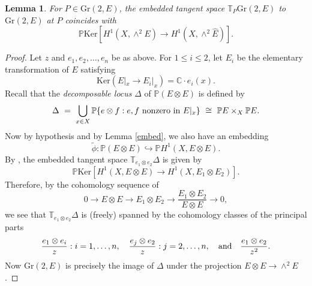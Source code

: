 \documentclass[10pt]{amsart}
\numberwithin{equation}{section}
\newcommand{\pp}{\mathbb P}
\newcommand{\cc}{\mathbb C}
\newcommand{\bt}{\mathbb T}
\newcommand{\Ker}{\mathrm{Ker}}
\newcommand{\Gr}{\mathrm{Gr}}
\newtheorem{lemma}[theorem]{{\textbf Lemma}}
\begin{document}
\begin{lemma} \label{tangent} For $P \in \Gr(2, E)$, the embedded tangent space $\bt_P \Gr(2, E)$ to $\Gr(2, E)$ at $P$ coincides with
\[ \pp \Ker \left[ H^1(X, \wedge^2 E) \longrightarrow H^1 \left( X, \wedge^2 \hat{E} \right) \right]. \]
\end{lemma}
\begin{proof}
Let $z$ and $e_1, e_2, \ldots , e_n$ be as above. For $1 \le i \le 2$, let $E_i$ be the elementary transformation of $E$ satisfying
\[ \Ker \left( E|_x \to E_i |_x \right) = \cc \cdot e_i (x). \]
Recall that the \textsl{decomposable locus} $\Delta$ of $\pp (E \otimes E)$ is defined by
\[ \Delta \ = \ \bigcup_{x \in X} \pp \{ e \otimes f : \hbox{$e, f$ nonzero in $E|_x$} \} \ \cong \ \pp E \times_X \pp E. \]
Now by hypothesis and by Lemma \ref{embed}, we also have an embedding
\[ \tilde{\phi} \colon \pp(E \otimes E) \hookrightarrow \pp H^1 (X, E \otimes E). \]
By \cite[Lemma 5.3]{CH1}, the embedded tangent space $\bt_{e_1 \otimes e_2} \Delta$ is given by
\[ \pp \Ker \left[ H^{1}(X, E \otimes E) \longrightarrow H^{1}(X, E_1 \otimes E_2) \right]. \]
Therefore, by the cohomology sequence of
\[ 0 \to E \otimes E \to E_1 \otimes E_2 \to \frac{E_1 \otimes E_2}{E \otimes E} \to 0, \]
we see that $\bt_{e_1 \otimes e_2} \Delta$ is (freely) spanned by the cohomology classes of the principal parts
\begin{equation} \frac{e_1 \otimes e_i}{z}: i = 1, \ldots , n, \quad \frac{e_j \otimes e_2}{z}: j = 2, \ldots , n, \quad \hbox{and} \quad \frac{e_1 \otimes e_2}{z^2}. \label{spanningset} \end{equation}
Now $\Gr(2, E)$ is precisely the image of $\Delta$ under the projection $E \otimes E \to \wedge^2 E$. %

\end{proof}
\end{document}
